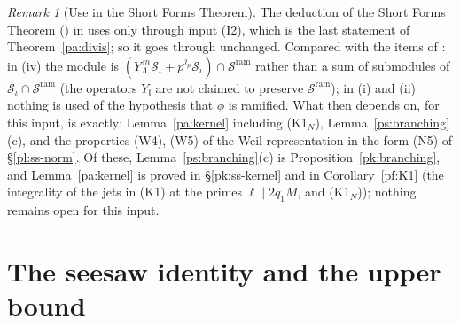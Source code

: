 \documentclass[10pt]{amsart}
\theoremstyle{definition}
\theoremstyle{remark}
\newtheorem{remark}[theorem]{Remark}
\providecommand{\auAz}{\mathcal A_0}
\providecommand{\auNm}{\operatorname{Nm}}
\providecommand{\auO}{\mathcal O}
\providecommand{\auP}{\mathcal P}
\providecommand{\auPa}{\Phi_a}
\providecommand{\auPl}{\Phi}
\providecommand{\auS}{\mathcal S}
\providecommand{\auSram}{\mathcal S^{\mathrm{ram}}}
\providecommand{\auU}{\mathrm U}
\providecommand{\aubar}[1]{\overline{#1}}
\providecommand{\aurd}{\mathrm{rd}_E}
\providecommand{\ausinf}{s_\infty}
\begin{document}
\begin{remark}[Use in the Short Forms Theorem]
The deduction of the Short Forms Theorem ({\cite[Theorem~14.13]{P46}}) in {\cite[\S14.7]{P46}} uses {\cite[Proposition~14.20]{P46}} only
through input (I2), which is the last statement of Theorem~\ref{pa:divis}; so it goes through
unchanged. Compared with the items of {\cite[Proposition~14.20]{P46}}: in (iv) the module is
$(Y_\Lambda^{\,m}\auS_\iota+p^{j_p}\auS_\iota)\cap\auSram$ rather than a sum of submodules of
$\auS_\iota\cap\auSram$ (the operators $Y_{\mathfrak l}$ are not claimed to preserve $\auSram$); in
(i) and (ii) nothing is used of the hypothesis that $\phi$ is ramified. What {\cite[Theorem~14.13]{P46}} then depends on, for this input, is exactly: Lemma~\ref{pa:kernel}
including (K1$_N$), Lemma~\ref{ps:branching}(c), and the properties (W4), (W5) of the Weil
representation in the form (N5) of \S\ref{pl:ss-norm}. Of these, Lemma~\ref{ps:branching}(c) is
Proposition~\ref{pk:branching}, and Lemma~\ref{pa:kernel} is proved in \S\ref{pk:ss-kernel} and in
Corollary~\ref{pf:K1} (the integrality of the jets in (K1) at the primes $\ell\mid2q_1M$, and
(K1$_N$)); nothing remains open for this input.
\end{remark}



\section{The seesaw identity and the upper bound}\label{A1:g4}
\providecommand{\auO}{\mathcal O}
\providecommand{\auU}{\mathrm U}
\providecommand{\auGL}{\mathrm{GL}}
\providecommand{\auHom}{\operatorname{Hom}}
\providecommand{\auA}{\mathbb A}
\providecommand{\auF}{\mathbb F}
\providecommand{\auPl}{\Phi}
\providecommand{\auPa}{\Phi_a}
\providecommand{\auS}{\mathcal S}
\providecommand{\auSram}{\mathcal S^{\mathrm{ram}}}
\providecommand{\auAz}{\mathcal A_0}
\providecommand{\auG}{\overline G}
\providecommand{\auP}{\mathcal P}
\providecommand{\auNm}{\operatorname{Nm}}
\providecommand{\auAut}{\operatorname{Aut}}
\providecommand{\aubar}[1]{\overline{#1}}
\providecommand{\ausinf}{s_\infty}
\providecommand{\aurd}{\mathrm{rd}_E}
\providecommand{\psM}{\mathsf M}
\providecommand{\psHS}{\mathscr H}
\providecommand{\psW}{\mathcal W}
\providecommand{\psZ}{Z}
\providecommand{\psvac}{\mathbf v}
\providecommand{\psrho}{\varrho}
\providecommand{\psE}{\mathcal E}
\providecommand{\psGlue}{\operatorname{Glue}}
\providecommand{\psfa}{\mathfrak a}
\providecommand{\psnot}[1]{\par\smallskip{\raggedright\noindent\textsc{Not proved here.} [#1]\par}\smallskip}
\renewcommand{\psHS}{\mathcal H}
\end{document}
